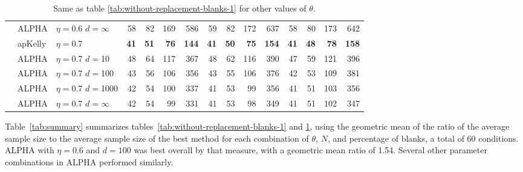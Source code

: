 \documentclass[12pt,runningheads]{llncs}
\begin{document}
{\begin{table}
\begin{tabular}{lll|rrrr|rrrr|rrrr}
 & ALPHA & $\eta=$0.6 $d=\infty$ & 58  & 82  & 169  & 586  & 59  & 82  & 172  & 637  & 58  & 80  & 173  & 642  \\
\cline{2-15} & apKelly & $\eta=$0.7 & \bf{41}  & \bf{51}  & \bf{76}  & \bf{144}  & \bf{41}  & \bf{50}  & \bf{75}  & \bf{154}  & \bf{41}  & \bf{48}  & \bf{78}  & \bf{158}  \\
& ALPHA & $\eta=$0.7 $d=$10 & 48  & 64  & 117  & 367  & 48  & 62  & 116  & 390  & 47  & 59  & 121  & 396  \\
& ALPHA & $\eta=$0.7 $d=$100 & 43  & 56  & 106  & 356  & 43  & 55  & 106  & 376  & 42  & 53  & 109  & 381  \\
& ALPHA & $\eta=$0.7 $d=$1000 & 42  & 54  & 100  & 337  & 41  & 53  & 99  & 356  & 41  & 51  & 103  & 356 \\
& ALPHA & $\eta=$0.7 $d=\infty$ & 42  & 54  & 99  & 331  & 41  & 53  & 98  & 349  & 41  & 51  & 102  & 347  \\

\end{tabular} 
\caption{\protect \label{tab:without-replacement-blanks-2}
Same as table \ref{tab:without-replacement-blanks-1} for other values of $\theta$.
}
\end{table}

Table~\ref{tab:summary} summarizes tables~\ref{tab:without-replacement-blanks-1} and \ref{tab:without-replacement-blanks-2},
using the geometric mean of the ratio of the average sample size to the 
average sample size of the best method for each combination of $\theta$, $N$, and percentage of blanks, a total
of 60 conditions.
ALPHA with $\eta=0.6$ and $d=100$ was best overall by that measure, with a geometric mean ratio of 1.54.
Several other parameter combinations in ALPHA performed similarly.

}
\end{document}
